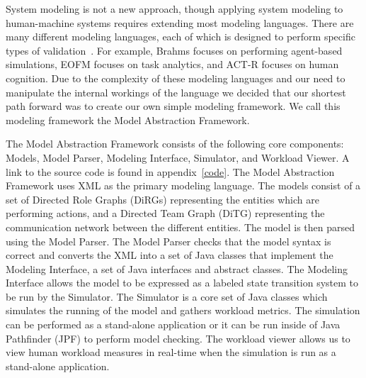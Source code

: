 System modeling is not a new approach, though applying system modeling to human-machine systems requires extending most modeling languages.  There are many different modeling languages, each of which is designed to perform specific types of validation~\cite{bolton2013litreview}.  For example, Brahms focuses on performing agent-based simulations, EOFM focuses on task analytics, and ACT-R focuses on human cognition.  Due to the complexity of these modeling languages and our need to manipulate the internal workings of the language we decided that our shortest path forward was to create our own simple modeling framework.  We call this modeling framework the Model Abstraction Framework.

\begin{comment}
In order to obtain workload metrics from a modeling language we knew that we would need to manipulate the input language, the model checker, the simulator, etc. of said modeling language.  We determined that the shortest path

 the ability to manipulate all aspects of the modelingEach of these modeling languages has proven successful at modeling human-machine systems, however, at the time none offered the tools necessary to extract the workload data we desired.  We determined the fastest approach for acheiving   it was possible to attempt to add our workload metrics to one of the existing modeling languages capable of modeling a UAS, such as Brahms~\cite{}, EOFM~\cite{}, ACT-R~\cite{}, etc.
Finally, we desired to perform human workload measurements on the model as part of our approach to reducing the required number of humans involved in UASs.
\end{comment}

The Model Abstraction Framework consists of the following core components:  Models, Model Parser, Modeling Interface, Simulator, and Workload Viewer.  A link to the source code is found in appendix~\ref{code}.  The Model Abstraction Framework uses XML as the primary modeling language.  The models consist of a set of Directed Role Graphs (DiRGs) representing the entities which are performing actions, and a Directed Team Graph (DiTG) representing the communication network between the different entities.  The model is then parsed using the Model Parser.  The Model Parser checks that the model syntax is correct and converts the XML into a set of Java classes that implement the Modeling Interface, a set of Java interfaces and abstract classes.  The Modeling Interface allows the model to be expressed as a labeled state transition system to be run by the Simulator.  The Simulator is a core set of Java classes which simulates the running of the model and gathers workload metrics.  The simulation can be performed as a stand-alone application or it can be run inside of Java Pathfinder (JPF) to perform model checking.  The workload viewer allows us to view human workload measures in real-time when the simulation is run as a stand-alone application.

